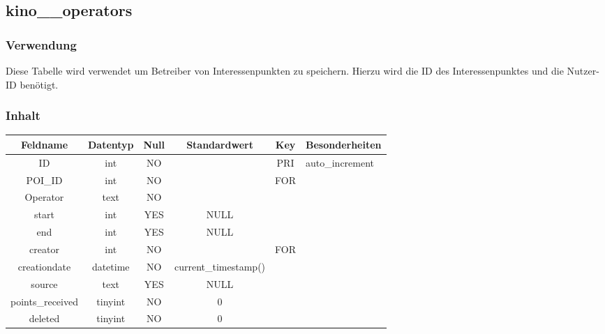 \subsection{kino\_\_operators}
\subsubsection{Verwendung} Diese Tabelle wird verwendet um Betreiber von Interessenpunkten zu speichern. Hierzu wird die ID des Interessenpunktes und die Nutzer-ID benötigt.
\subsubsection{Inhalt}
\begin{table}[H]
	\begin{tabular}{|c|c|c|c|c|p{3.5cm}|}
		\hline
		\textbf{Feldname} & \textbf{Datentyp} & \textbf{Null} & \textbf{Standardwert} & \textbf{Key}   & \textbf{Besonderheiten} \\ \hline
		ID & int & NO &  & PRI & auto\_increment \\ \hline
		POI\_ID & int & NO &  & FOR & \\ \hline
		Operator & text & NO &  &  & \\ \hline
		start & int & YES & NULL &  & \\ \hline
		end & int & YES & NULL &  & \\ \hline
		creator & int & NO &  & FOR & \\ \hline
		creationdate & datetime & NO & current\_timestamp() &  & \\ \hline
		source & text & YES & NULL &  & \\ \hline
		points\_received & tinyint & NO & 0 &  & \\ \hline
		deleted & tinyint & NO & 0 &  & \\ \hline
	\end{tabular}
\end{table}
